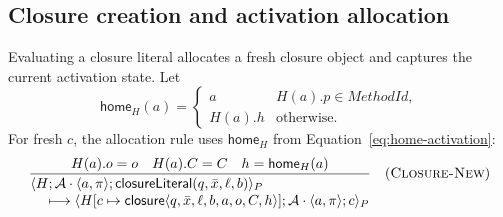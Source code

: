 \documentclass[11pt]{article}
\numberwithin{equation}{section}
\newcommand{\kw}[1]{\ensuremath{\mathsf{#1}}}
\newcommand{\rulelabel}[1]{\textsc{#1}}
\begin{document}
\subsection{Closure creation and activation allocation}

Evaluating a closure literal allocates a fresh closure object and captures the
current activation state.  Let
\begin{equation}\label{eq:home-activation}
 \mathsf{home}_H(a)=
 \begin{cases}
  a & H(a).p\in\mathit{MethodId},\\
  H(a).h & \text{otherwise.}
\end{cases}
\end{equation}
For fresh $c$, the allocation rule uses $\mathsf{home}_H$ from
Equation~\eqref{eq:home-activation}:
\[
\dfrac{H(a).o=o\quad H(a).C=C\quad h=\mathsf{home}_H(a)}
 {\begin{aligned}
  &\langle H;\mathcal A\cdot\langle a,\pi\rangle;
       \kw{closureLiteral}(q,\bar x,\ell,b)\rangle_P\\[-1mm]
  &\quad\longmapsto
   \langle H[c\mapsto\kw{closure}\langle q,\bar x,\ell,b,a,o,C,h\rangle];
       \mathcal A\cdot\langle a,\pi\rangle;c\rangle_P
  \end{aligned}}
\quad(\rulelabel{Closure-New})
\]
\end{document}
